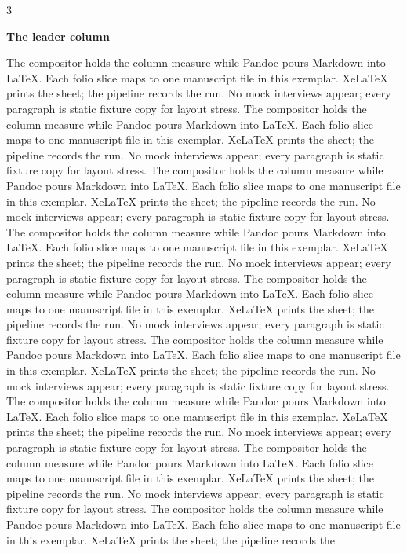 \documentclass[
]{article}
\begin{document}
\begin{multicols}{3}

\textbf{The leader column}

The compositor holds the column measure while Pandoc pours Markdown into
LaTeX. Each folio slice maps to one manuscript file in this exemplar.
XeLaTeX prints the sheet; the pipeline records the run. No mock
interviews appear; every paragraph is static fixture copy for layout
stress. The compositor holds the column measure while Pandoc pours
Markdown into LaTeX. Each folio slice maps to one manuscript file in
this exemplar. XeLaTeX prints the sheet; the pipeline records the run.
No mock interviews appear; every paragraph is static fixture copy for
layout stress. The compositor holds the column measure while Pandoc
pours Markdown into LaTeX. Each folio slice maps to one manuscript file
in this exemplar. XeLaTeX prints the sheet; the pipeline records the
run. No mock interviews appear; every paragraph is static fixture copy
for layout stress. The compositor holds the column measure while Pandoc
pours Markdown into LaTeX. Each folio slice maps to one manuscript file
in this exemplar. XeLaTeX prints the sheet; the pipeline records the
run. No mock interviews appear; every paragraph is static fixture copy
for layout stress. The compositor holds the column measure while Pandoc
pours Markdown into LaTeX. Each folio slice maps to one manuscript file
in this exemplar. XeLaTeX prints the sheet; the pipeline records the
run. No mock interviews appear; every paragraph is static fixture copy
for layout stress. The compositor holds the column measure while Pandoc
pours Markdown into LaTeX. Each folio slice maps to one manuscript file
in this exemplar. XeLaTeX prints the sheet; the pipeline records the
run. No mock interviews appear; every paragraph is static fixture copy
for layout stress. The compositor holds the column measure while Pandoc
pours Markdown into LaTeX. Each folio slice maps to one manuscript file
in this exemplar. XeLaTeX prints the sheet; the pipeline records the
run. No mock interviews appear; every paragraph is static fixture copy
for layout stress. The compositor holds the column measure while Pandoc
pours Markdown into LaTeX. Each folio slice maps to one manuscript file
in this exemplar. XeLaTeX prints the sheet; the pipeline records the
run. No mock interviews appear; every paragraph is static fixture copy
for layout stress. The compositor holds the column measure while Pandoc
pours Markdown into LaTeX. Each folio slice maps to one manuscript file
in this exemplar. XeLaTeX prints the sheet; the pipeline records the

\end{multicols}
\end{document}
